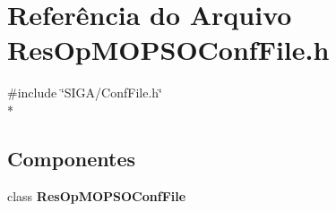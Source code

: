 \section{Referência do Arquivo Res\+Op\+M\+O\+P\+S\+O\+Conf\+File.\+h}
\label{_tecniques_2_m_o_p_s_o_2_res_op_m_o_p_s_o_conf_file_8h}
{\ttfamily \#include \char`\"{}S\+I\+G\+A/\+Conf\+File.\+h\char`\"{}}\\*
\subsection*{Componentes}
\begin{DoxyCompactItemize}
\item 
class {\bf Res\+Op\+M\+O\+P\+S\+O\+Conf\+File}
\end{DoxyCompactItemize}
